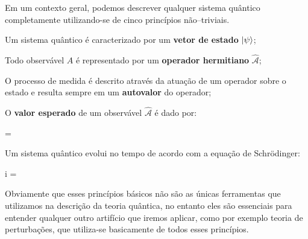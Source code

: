 Em um contexto geral, podemos descrever qualquer sistema quântico completamente utilizando-se de cinco princípios não--triviais.
    \begin{myitemize}
        \item Um sistema quântico é caracterizado por um \textbf{vetor de estado} $\ket{\psi}$;
        
        \item Todo observável $A$ é representado por um \textbf{operador hermitiano} $\hat{\mathcal{A}}$;
        
        \item O processo de medida é descrito através da atuação de um operador sobre o estado e resulta sempre em um \textbf{autovalor} do operador;
        
        \item O \textbf{valor esperado} de um observável $\hat{\mathcal{A}}$ é dado por:
            \begin{answer*}
                \langle {} \rangle = \bra{\psi}\ket{\psi}
            \end{answer*}
        
        \item Um sistema quântico evolui no tempo de acordo com a equação de Schrödinger:
            \begin{answer*}
                i\hbar{} = 
            \end{answer*}
    \end{myitemize}

    Obviamente que esses princípios básicos não são as únicas ferramentas que utilizamos na descrição da teoria quântica, no entanto eles são essenciais para entender qualquer outro artifício que iremos aplicar, como por exemplo teoria de perturbações, que utiliza-se basicamente de todos esses princípios.
    